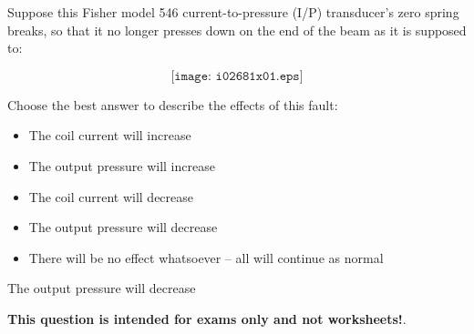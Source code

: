 

Suppose this Fisher model 546 current-to-pressure (I/P) transducer's zero spring breaks, so that it no longer presses down on the end of the beam as it is supposed to:

$$\texttt{[image: i02681x01.eps]}$$

\noindent
Choose the best answer to describe the effects of this fault:

\begin{itemize}
\item{} The coil current will increase
\vskip 10pt
\item{} The output pressure will increase 
\vskip 10pt
\item{} The coil current will decrease 
\vskip 10pt
\item{} The output pressure will decrease 
\vskip 10pt
\item{} There will be no effect whatsoever -- all will continue as normal
\end{itemize}







The output pressure will decrease 







{\bf This question is intended for exams only and not worksheets!}.



